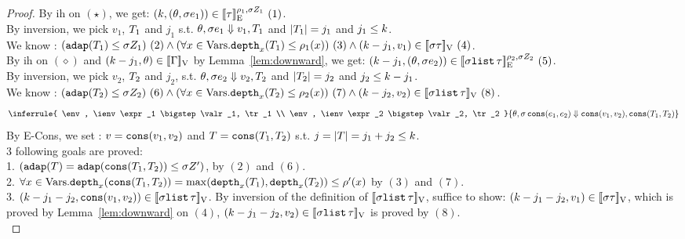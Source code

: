 \documentclass[a4paper,11pt]{article}
\theoremstyle{definition}
\begin{document}
\begin{proof}
  By ih on $(\star)$, we get: $(k, (\theta,
\sigma e_1  )) \in [\![ \tau ]\!]_{\text{E}}^{\rho_1, \sigma Z_1}~(1)$.\\
%
By inversion, we pick $v_1$, $T_1$ and $j_1$ 
%
s.t. $\theta, \sigma e_1 \mathrel{\Downarrow} v_1, T_1$ 
%
and $|T_1| = j_1$
%
and $j_1 \leq k$.\\
%
We know : 
%
$ (\adap(\tr_1) \leq \ienv \nnatA_1) ~ (2) 
%
\land (\forall x \in \mbox{Vars}. \ddep{x}(\tr_1) \leq \dmap_1(x)) ~ (3)
%
\land (\stepiA - j_1, \valr_1) \in \lrv{\ienv \type} ~ (4)$.\\
%
By ih on $(\diamond)$
%
and $(k-j_1, \theta) \in [\![ \Gamma ]\!]_{\text{V}}$ by Lemma~\ref{lem:downward},
%
we get: $(k-j_1, (\theta, \sigma e_2  )) \in [\![  \sigma \mathtt{list} \,  \tau  ]\!]_{\text{E}}^{\rho_2, \sigma Z_2}~(5)$.\\
%
By inversion, we pick $v_2$, $T_2$ and $j_2$,  s.t. $\theta, \sigma e_2
\mathrel{\Downarrow} v_2, T_2$ and $|T_2| = j_2$ and $j_2 \leq
k-j_1$.\\
%
We know : $ (\mathtt{adap}(T_2) \leq \sigma Z_2) ~ (6) 
\land (\forall x \in \mbox{Vars}. \mathtt{depth}_{x}(T_2) \leq \rho_2(x)) ~ (7)
\land (k - j_2, v_2) \in [\![ \sigma \mathtt{list} \, \tau ]\!]_{\text{V}} ~ (8)$.
%
\[
\inferrule{
\env, \ienv \expr_1 \bigstep \valr_1, \tr_1 \\
\env, \ienv \expr_2 \bigstep \valr_2, \tr_2
}
{ \env, \ienv \econs (\expr_1, \expr_2)  \bigstep \econs (\valr_1, \valr_2),
  \trcons(\tr_1, \tr_2)
}
\]
%
By E-Cons, we set : $v = \mathop{\mathtt{cons}}(v_1, v_2)$ and $T =
\mathop{\mathtt{cons}}(T_1, T_2)$ s.t. $j = |T|= j_1 + j_2 \leq k$.\\
3 following goals are proved:\\ 
%
1. $(\mathtt{adap}(T) = \mathtt{adap}(\mathop{\mathtt{cons}}(T_1, T_2)) \leq
\sigma Z')$, by $(2)$ and $(6)$.\\
2. $\forall x \in \mbox{Vars}. \mathtt{depth}_{x}(\mathop{\mathtt{cons}}(T_1, T_2))
= \max ( \mathtt{depth}_{x}(T_1), \mathtt{depth}_{x}(T_2) ) \leq
\rho'(x)$ by $(3)$ and $(7)$. \\
3. $(k - j_1 -j_2, \mathop{\mathtt{cons}}(v_1,v_2)  )  \in [\![  \sigma \mathtt{list} \, \tau  ]\!]_{\text{V}}$.
%
By inversion of the definition of $[\![ \sigma \mathtt{list} \, \tau ]\!]_{\text{V}}$,
%
suffice to show:
%
$(k-j_1-j_2, v_1) \in [\![ \sigma \tau ]\!]_{\text{V}}$,
%
which is proved by Lemma~\ref{lem:downward} on $(4)$,
%
$(k-j_1-j_2, v_2) \in [\![  \sigma \mathtt{list} \, \tau ]\!]_{\text{V}}$ 
%
is proved by $(8)$.\\



\end{proof}
\end{document}
